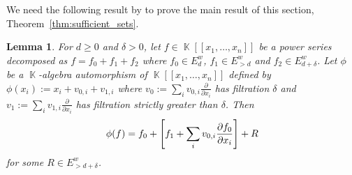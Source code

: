 \documentclass[noend]{amsproc}
\newtheorem{lemma}[theorem]{Lemma}
\theoremstyle{definition}
\let\originalleft\left
\let\originalright\right
\renewcommand{\left}{\mathopen{}\mathclose\bgroup\originalleft}
\renewcommand{\right}{\aftergroup\egroup\originalright}
\DeclareMathOperator{\K}{\mathbb{K}}
\begin{document}
We need the following result by \citet{A1974} to prove the main result of this
section, Theorem~\ref{thm:sufficient_sets}.

\begin{lemma}\label{lem:filtration}
For $d \geq 0$ and $\delta > 0$, let $f \in \K[[x_1,\ldots,x_n]]$ be a power
series decomposed as $f = f_0+f_1+f_2$ where $f_0 \in E^w_d$,
$f_1 \in E^w_{>d}$ and $f_2 \in E^w_{d+\delta}$. Let
$\phi$ be a $\K$-algebra automorphism of $\K[[x_1,\ldots,x_n]]$ defined by
$\phi(x_i) := x_i+v_{0,i}+v_{1,i}$ where
$v_0 := \sum_iv_{0,i}\frac{\partial}{\partial x_i}$ has filtration $\delta$ and
$v_1 := \sum_iv_{1,i}\frac{\partial}{\partial x_i}$ has filtration strictly
greater than $\delta$. Then
\[
\phi(f)
= f_0 + \left[f_1 + \sum_i v_{0,i}\frac{\partial f_0}{\partial x_i}\right] + R
\]
for some $R\in E^w_{>d+\delta}$.
\end{lemma}
\end{document}
